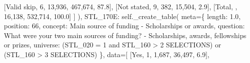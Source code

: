 \documentclass[
  11pt,
  a4paper,
]{article}
\newenvironment{Shaded}{\begin{snugshade}}{\end{snugshade}}
\newcommand{\NormalTok}[1]{\textcolor[rgb]{0.00,0.23,0.31}{#1}}
\newcommand{\OperatorTok}[1]{\textcolor[rgb]{0.37,0.37,0.37}{#1}}
\newcommand{\StringTok}[1]{\textcolor[rgb]{0.13,0.47,0.30}{#1}}
\newcommand{\VariableTok}[1]{\textcolor[rgb]{0.07,0.07,0.07}{#1}}
\begin{document}
\begin{Shaded}
\begin{Highlighting}[]
\NormalTok{                    [}\StringTok{\textquotesingle{}Valid skip\textquotesingle{}}\NormalTok{, }\StringTok{\textquotesingle{}6\textquotesingle{}}\NormalTok{, }\StringTok{\textquotesingle{}13,936\textquotesingle{}}\NormalTok{, }\StringTok{\textquotesingle{}467,674\textquotesingle{}}\NormalTok{, }\StringTok{\textquotesingle{}87.8\textquotesingle{}}\NormalTok{],}
\NormalTok{                    [}\StringTok{\textquotesingle{}Not stated\textquotesingle{}}\NormalTok{, }\StringTok{\textquotesingle{}9\textquotesingle{}}\NormalTok{, }\StringTok{\textquotesingle{}382\textquotesingle{}}\NormalTok{, }\StringTok{\textquotesingle{}15,504\textquotesingle{}}\NormalTok{, }\StringTok{\textquotesingle{}2.9\textquotesingle{}}\NormalTok{],}
\NormalTok{                    [}\StringTok{\textquotesingle{}Total\textquotesingle{}}\NormalTok{, }\StringTok{\textquotesingle{}\textquotesingle{}}\NormalTok{, }\StringTok{\textquotesingle{}16,138\textquotesingle{}}\NormalTok{, }\StringTok{\textquotesingle{}532,714\textquotesingle{}}\NormalTok{, }\StringTok{\textquotesingle{}100.0\textquotesingle{}}\NormalTok{]}
\NormalTok{                ]}
\NormalTok{            ),}
            \StringTok{\textquotesingle{}STL\_170E\textquotesingle{}}\NormalTok{: }\VariableTok{self}\NormalTok{.\_create\_table(}
\NormalTok{                meta}\OperatorTok{=}\NormalTok{\{}
                    \StringTok{\textquotesingle{}length\textquotesingle{}}\NormalTok{: }\StringTok{\textquotesingle{}1.0\textquotesingle{}}\NormalTok{, }\StringTok{\textquotesingle{}position\textquotesingle{}}\NormalTok{: }\StringTok{\textquotesingle{}66\textquotesingle{}}\NormalTok{,}
                    \StringTok{\textquotesingle{}concept\textquotesingle{}}\NormalTok{: }\StringTok{\textquotesingle{}Main source of funding {-} Scholarships or awards\textquotesingle{}}\NormalTok{,}
                    \StringTok{\textquotesingle{}question\textquotesingle{}}\NormalTok{: }\StringTok{\textquotesingle{}What were your two main sources of funding? {-} Scholarships, awards, fellowships or prizes\textquotesingle{}}\NormalTok{,}
                    \StringTok{\textquotesingle{}universe\textquotesingle{}}\NormalTok{: }\StringTok{\textquotesingle{}(STL\_020 = 1 and STL\_160 \textgreater{} 2 SELECTIONS) or (STL\_160 \textgreater{} 3 SELECTIONS)\textquotesingle{}}
\NormalTok{                \},}
\NormalTok{                data}\OperatorTok{=}\NormalTok{[}
\NormalTok{                    [}\StringTok{\textquotesingle{}Yes\textquotesingle{}}\NormalTok{, }\StringTok{\textquotesingle{}1\textquotesingle{}}\NormalTok{, }\StringTok{\textquotesingle{}1,687\textquotesingle{}}\NormalTok{, }\StringTok{\textquotesingle{}36,497\textquotesingle{}}\NormalTok{, }\StringTok{\textquotesingle{}6.9\textquotesingle{}}\NormalTok{],}

\end{Highlighting}
\end{Shaded}
\end{document}
